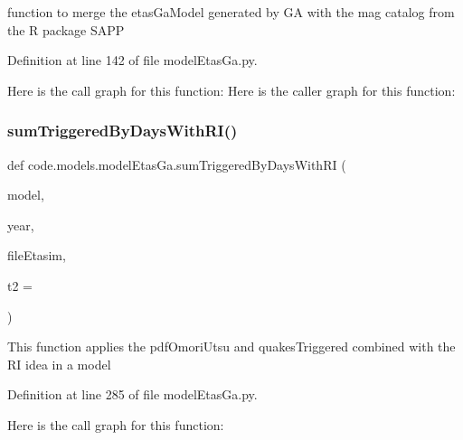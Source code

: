 \begin{DoxyVerb}function to merge the etasGaModel generated by GA with the mag catalog from the R package SAPP 
\end{DoxyVerb}
 

Definition at line 142 of file model\+Etas\+Ga.\+py.

Here is the call graph for this function\+:
Here is the caller graph for this function\+:
\mbox{\label{namespacecode_1_1models_1_1model_etas_ga_a63915f295f9d14786a5a81bfa8c345ac}} 
\subsubsection{\texorpdfstring{sum\+Triggered\+By\+Days\+With\+R\+I()}{sumTriggeredByDaysWithRI()}}
{\footnotesize\ttfamily def code.\+models.\+model\+Etas\+Ga.\+sum\+Triggered\+By\+Days\+With\+RI (\begin{DoxyParamCaption}\item[{}]{model,  }\item[{}]{year,  }\item[{}]{file\+Etasim,  }\item[{}]{t2 = {} }\end{DoxyParamCaption})}

\begin{DoxyVerb}This function applies the pdfOmoriUtsu and quakesTriggered combined with the RI idea in a model
\end{DoxyVerb}
 

Definition at line 285 of file model\+Etas\+Ga.\+py.

Here is the call graph for this function\+:
